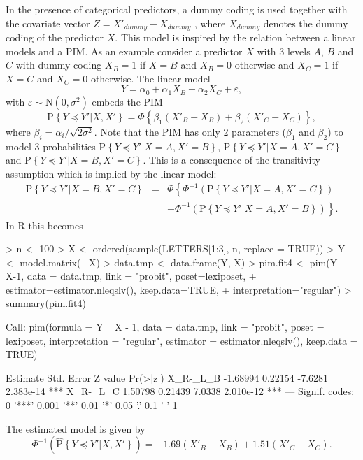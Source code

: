 \documentclass[12pt]{article}
\newcommand{\prob}[1]{\text{P}\left\{#1\right\}}
\newcommand{\hatprob}[1]{\hat{\text{P}}\left\{#1\right\}}
\newcommand{\leqs}{\preccurlyeq}
\begin{document}
In the presence of categorical predictors, a dummy coding is used together with the covariate vector $Z = X'_{dummy} - X_{dummy}$ , where $X_{dummy}$ denotes the dummy coding of the predictor $X$. This model is inspired by the relation between a linear models and a PIM. As an example consider a predictor $X$ with 3 levels $A$, $B$ and $C$ with dummy coding $X_{B} = 1$ if $X=B$ and $X_{B} = 0$ otherwise and $X_C = 1$ if $X = C$ and $X_C = 0$ otherwise. The linear model
\[
Y = \alpha_0 + \alpha_1 X_B + \alpha_2 X_C + \varepsilon,
\] 
with $\varepsilon \sim \text{N}(0,\sigma^2)$ embeds the PIM
\[
\prob{Y \leqs Y'| X, X'} = \Phi\left\{\beta_1 (X'_B - X_B) + \beta_2 (X'_C - X_C) \right\},
\]
where $\beta_i = \alpha_i/\sqrt{2 \sigma^2}$. Note that the PIM has only 2 parameters ($\beta_1$ and $\beta_2$) to model 3 probabilities $\prob{Y \leqs Y'| X = A, X' = B}$, $\prob{Y \leqs Y'| X = A, X' = C}$ and $\prob{Y \leqs Y'| X = B, X' = C}$. This is a consequence of the transitivity assumption which is implied by the linear model:
\begin{eqnarray*}
\prob{Y \leqs Y'| X = B, X' = C} &=& \Phi\left\{ \Phi^{-1} \left(\prob{Y \leqs Y'| X = A, X' = C} \right)  \right. \\
																 & & \left. 	- \Phi^{-1}\left(\prob{Y \leqs Y'| X = A, X' = B} \right) \right\}.
\end{eqnarray*}
In R this becomes
\begin{Schunk}
\begin{Sinput}
> n <- 100
> X <- ordered(sample(LETTERS[1:3], n, replace = TRUE))
> Y <- model.matrix(~ X)%
> data.tmp <- data.frame(Y, X)
> pim.fit4 <- pim(Y ~ X-1, data = data.tmp, link = "probit", poset=lexiposet, 
+   estimator=estimator.nleqslv(), keep.data=TRUE, 
+   interpretation="regular")
> summary(pim.fit4)
\end{Sinput}
\begin{Soutput}
Call:
pim(formula = Y ~ X - 1, data = data.tmp, link = "probit", poset = lexiposet, 
    interpretation = "regular", estimator = estimator.nleqslv(), 
    keep.data = TRUE)

         Estimate Std. Error Z value  Pr(>|z|)    
X_R-_L_B -1.68994    0.22154 -7.6281 2.383e-14 ***
X_R-_L_C  1.50798    0.21439  7.0338 2.010e-12 ***
---
Signif. codes:  0 '***' 0.001 '**' 0.01 '*' 0.05 '.' 0.1 ' ' 1 
\end{Soutput}
\end{Schunk}
The estimated model is given by
\[
\Phi^{-1}\left( \hatprob{Y \leqs Y'| X, X'} \right)= -1.69 (X'_B - X_B) + 1.51 (X'_C - X_C).
\]
\end{document}

